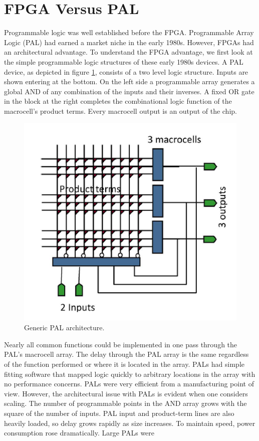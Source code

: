 \section{FPGA Versus PAL}
\noindent Programmable logic was well established before the
FPGA. Programmable Array Logic
(PAL) had earned a market niche in the early 1980s.
However, FPGAs had an architectural advantage. To understand
the FPGA advantage, we first look at the simple
programmable logic structures of these early 1980s devices.
A PAL device, as depicted in figure \ref{fig:pal}, consists of a two level
logic structure. Inputs are shown entering at
the bottom. On the left side a programmable array
generates a global AND of any combination of the
inputs and their inverses. A fixed OR gate in the block at
the right completes the combinational logic function of the
macrocell’s product terms. Every macrocell output is an
output of the chip.
\begin{figure}[H]
	\centering
	\includegraphics[width=0.7\linewidth]{IMG/ch3/PAL}
	\caption{Generic PAL architecture.}
	\label{fig:pal}
\end{figure}
\noindent Nearly all common functions could be implemented in one pass through the PAL's macrocell array.
The delay through the PAL array is the same regardless of the function performed or where it is located in the array.
PALs had simple fitting software that mapped logic quickly to arbitrary locations in the array with no performance concerns.
PALs were very efficient from a manufacturing point of view.
However, the architectural issue with PALs is evident when one considers scaling. The number of programmable points in
the AND array grows with the square of the number of inputs. PAL input and product-term lines are also
heavily loaded, so delay grows rapidly as size increases. To maintain speed, power consumption rose dramatically. Large PALs were
